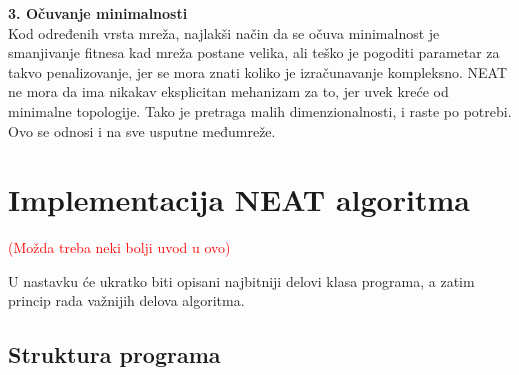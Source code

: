 \documentclass[a4paper]{article}
\begin{document}
\noindent
\label{specijacija}
\textbf{3. Očuvanje minimalnosti} \\
\indent
Kod određenih vrsta mreža, najlakši način da se očuva minimalnost je smanjivanje fitnesa kad mreža postane velika, ali teško je pogoditi parametar za takvo penalizovanje, jer se mora znati koliko je izračunavanje kompleksno. NEAT ne mora da ima nikakav eksplicitan mehanizam za to, jer uvek kreće od minimalne topologije. Tako je pretraga malih dimenzionalnosti, i raste po potrebi. Ovo se odnosi i na sve usputne međumreže.

\section{Implementacija NEAT algoritma}
\label{implementacija}

\textcolor{red}{(Možda treba neki bolji uvod u ovo)}

U nastavku će ukratko biti opisani najbitniji delovi klasa programa, a zatim princip rada važnijih delova algoritma.

\subsection{Struktura programa}
\label{struktura}
\end{document}
